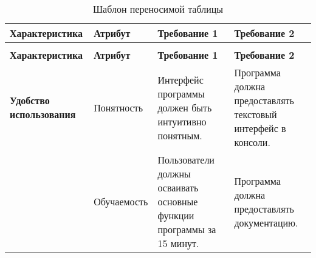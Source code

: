 \begin{longtable}{|p{3cm}|p{3cm}|p{4cm}|p{4cm}|}
	\caption{Шаблон переносимой таблицы} \label{table:} \\

	\hline
	\textbf{Характеристика}
	& \textbf{Атрибут}
	& \textbf{Требование 1}
	& \textbf{Требование 2} \\
	\hline
	\endfirsthead

	\conttable{table:} \\

	\hline
	\textbf{Характеристика}
	& \textbf{Атрибут}
	& \textbf{Требование 1}
	& \textbf{Требование 2} \\
	\hline
	\endhead

	\textbf{Удобство использования}
	& Понятность
	& Интерфейс программы должен быть интуитивно понятным.
	& Программа должна предоставлять текстовый интерфейс в консоли. \\ \hline

	& Обучаемость
	& Пользователи должны осваивать основные функции программы за 15 минут.
	& Программа должна предоставлять документацию. \\ \hline

\end{longtable}

